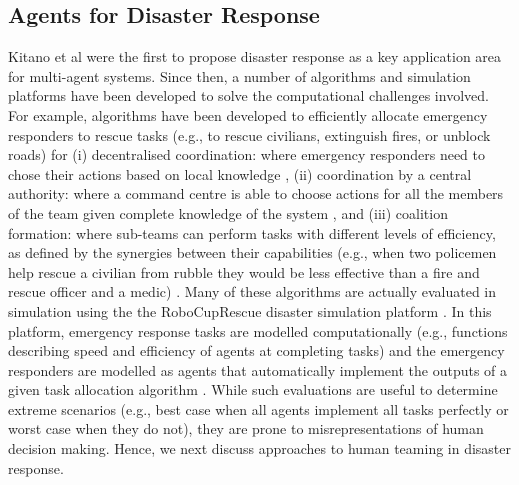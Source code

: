 \subsection{Agents for Disaster Response}\label{sec:agents disasters}
Kitano et al \cite{kitano:2001} were the first to propose disaster response as a key application area for multi-agent systems. Since then, a number of algorithms and simulation platforms have been developed to solve the computational challenges involved. For example, algorithms  have been developed to efficiently allocate emergency responders to rescue tasks (e.g., to rescue civilians, extinguish fires, or unblock roads) for (i) decentralised coordination: where emergency responders need to chose their actions based on local knowledge \cite{Chapman2009,puyol:etal:2014}, (ii)  coordination by a central authority: where a command centre is able to choose actions for all the members of the team given complete knowledge of the system \cite{koes2006constraint,Scerri2005,Khan-2011-JAAMAS} , and (iii) coalition formation: where sub-teams can perform tasks with different levels of efficiency, as defined by the synergies between their capabilities (e.g., when two policemen help rescue a civilian from rubble they would be less effective than a fire and rescue officer and a medic) \cite{ramchurn:etal}. Many of these algorithms are actually evaluated in simulation using the the RoboCupRescue disaster simulation platform \cite{skinner:ramchurn:2010}. In this platform, emergency response tasks are modelled computationally (e.g., functions describing speed and efficiency of agents at completing tasks) and the emergency responders are modelled as agents that automatically implement the outputs of a given task allocation algorithm \cite{kleiner:etal:2013,ramchurn:etal:2010}. While such evaluations are useful to determine extreme scenarios (e.g., best case when all agents implement all tasks perfectly or worst case when they do not), they are prone to misrepresentations of human decision making. Hence, we next discuss approaches to human teaming in disaster response.


